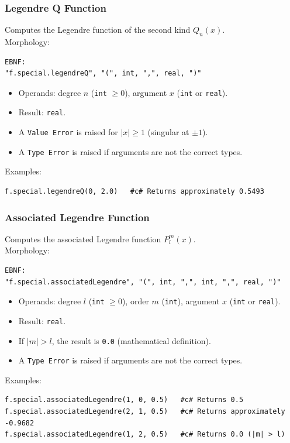\subsubsection{Legendre Q Function}
Computes the Legendre function of the second kind $Q_n(x)$. \\
Morphology:
\begin{verbatim}
EBNF:
"f.special.legendreQ", "(", int, ",", real, ")"
\end{verbatim}
\begin{itemize}
\item Operands: degree $n$ (\texttt{int} $\geq 0$), argument $x$ (\texttt{int} or \texttt{real}).
\item Result: \texttt{real}.
\item A \texttt{Value Error} is raised for $|x| \geq 1$ (singular at $\pm 1$).
\item A \texttt{Type Error} is raised if arguments are not the correct types.
\end{itemize}
Examples:
\begin{verbatim}
f.special.legendreQ(0, 2.0)   #c# Returns approximately 0.5493
\end{verbatim}

\subsubsection{Associated Legendre Function}
Computes the associated Legendre function $P_l^m(x)$. \\
Morphology:
\begin{verbatim}
EBNF:
"f.special.associatedLegendre", "(", int, ",", int, ",", real, ")"
\end{verbatim}
\begin{itemize}
\item Operands: degree $l$ (\texttt{int} $\geq 0$), order $m$ (\texttt{int}), argument $x$ (\texttt{int} or \texttt{real}).
\item Result: \texttt{real}.
\item If $|m| > l$, the result is \texttt{0.0} (mathematical definition).
\item A \texttt{Type Error} is raised if arguments are not the correct types.
\end{itemize}
Examples:
\begin{verbatim}
f.special.associatedLegendre(1, 0, 0.5)   #c# Returns 0.5
f.special.associatedLegendre(2, 1, 0.5)   #c# Returns approximately -0.9682
f.special.associatedLegendre(1, 2, 0.5)   #c# Returns 0.0 (|m| > l)
\end{verbatim}

